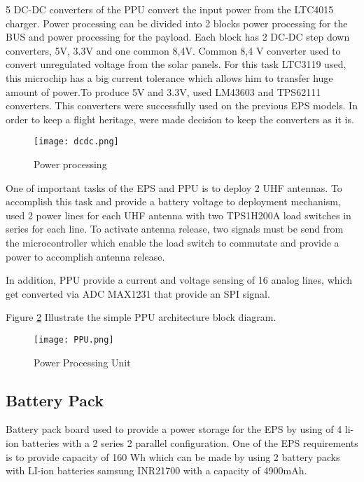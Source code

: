   5 DC-DC converters of the PPU convert the input power from the LTC4015 charger. Power processing can be divided into 2 blocks power processing for the BUS and power processing for the payload. Each block has 2 DC-DC step down converters, 5V, 3.3V and one common 8,4V. Common 8,4 V converter used to convert unregulated voltage from the solar panels. For this task LTC3119 used, this microchip has a big current tolerance which allows him to transfer huge amount of power.To produce 5V and 3.3V, used LM43603 and TPS62111 converters. This converters were successfully used on the previous EPS models. In order to keep a flight heritage, were made decision to keep the converters as it is. 
  
   \begin{figure}[h]
   	\centering
   	\texttt{[image: dcdc.png]}
   	\caption{Power processing}
   	\label{fig: ltc4015}
   \end{figure}
  
  One of important tasks of the EPS and PPU is to deploy 2 UHF antennas. To accomplish this task and provide a battery voltage to deployment mechanism, used 2 power lines for each UHF antenna with two TPS1H200A load switches in series for each line. To activate antenna release, two signals must be send from the microcontroller which enable the load switch to commutate and provide a power to accomplish antenna release. 
  
  In addition, PPU provide a current and voltage sensing of 16 analog lines,  which get converted via ADC MAX1231 that provide an SPI signal. 
  
  Figure \ref{fig: PPU} Illustrate the simple PPU architecture block diagram. 
  
  \begin{figure}[h]
  	\centering
  	\texttt{[image: PPU.png]}
  	\caption{Power Processing Unit}
  	\label{fig: PPU}
  \end{figure}
  
     \subsection{Battery Pack}
  
 Battery pack board used to provide a power storage for the EPS by using of 4 li-ion batteries with a 2 series 2 parallel configuration. One of the EPS requirements is to provide capacity of 160 Wh which can be made by using 2 battery packs with LI-ion batteries samsung INR21700 with a capacity of 4900mAh.
 
